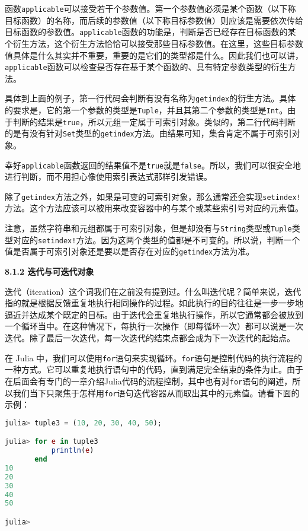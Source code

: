 函数\verb`applicable`可以接受若干个参数值。第一个参数值必须是某个函数（以下称目标函数）的名称，而后续的参数值（以下称目标参数值）则应该是需要依次传给目标函数的参数值。\verb`applicable`函数的功能是，判断是否已经存在目标函数的某个衍生方法，这个衍生方法恰恰可以接受那些目标参数值。在这里，这些目标参数值具体是什么其实并不重要，重要的是它们的类型都是什么。因此我们也可以讲，\verb`applicable`函数可以检查是否存在基于某个函数的、具有特定参数类型的衍生方法。

具体到上面的例子，第一行代码会判断有没有名称为\verb`getindex`的衍生方法。具体的要求是，它的第一个参数的类型是\verb`Tuple`，并且其第二个参数的类型是\verb`Int`。由于判断的结果是\verb`true`，所以元组一定属于可索引对象。类似的，第二行代码判断的是有没有针对\verb`Set`类型的\verb`getindex`方法。由结果可知，集合肯定不属于可索引对象。

幸好\verb`applicable`函数返回的结果值不是\verb`true`就是\verb`false`。所以，我们可以很安全地进行判断，而不用担心像使用索引表达式那样引发错误。

除了\verb`getindex`方法之外，如果是可变的可索引对象，那么通常还会实现\verb`setindex!`方法。这个方法应该可以被用来改变容器中的与某个或某些索引号对应的元素值。

注意，虽然字符串和元组都属于可索引对象，但是却没有与\verb`String`类型或\verb`Tuple`类型对应的\verb`setindex!`方法。因为这两个类型的值都是不可变的。所以说，判断一个值是否属于可索引对象还是要以是否存在对应的\verb`getindex`方法为准。

\textbf{8.1.2 迭代与可迭代对象}

迭代（iteration）这个词我们在之前没有提到过。什么叫迭代呢？简单来说，迭代指的就是根据反馈重复地执行相同操作的过程。如此执行的目的往往是一步一步地逼近并达成某个既定的目标。由于迭代会重复地执行操作，所以它通常都会被放到一个循环当中。在这种情况下，每执行一次操作（即每循环一次）都可以说是一次迭代。除了最后一次迭代，每一次迭代的结束点都会成为下一次迭代的起始点。

在 Julia 中，我们可以使用\verb`for`语句来实现循环。\verb`for`语句是控制代码的执行流程的一种方式。它可以重复地执行语句中的代码，直到满足完全结束的条件为止。由于在后面会有专门的一章介绍Julia代码的流程控制，其中也有对\verb`for`语句的阐述，所以我们当下只聚焦于怎样用\verb`for`语句迭代容器从而取出其中的元素值。请看下面的示例：
\begin{lstlisting}[language=julia]
julia> tuple3 = (10, 20, 30, 40, 50);

julia> for e in tuple3
           println(e)
       end
10
20
30
40
50

julia> 
\end{lstlisting}

